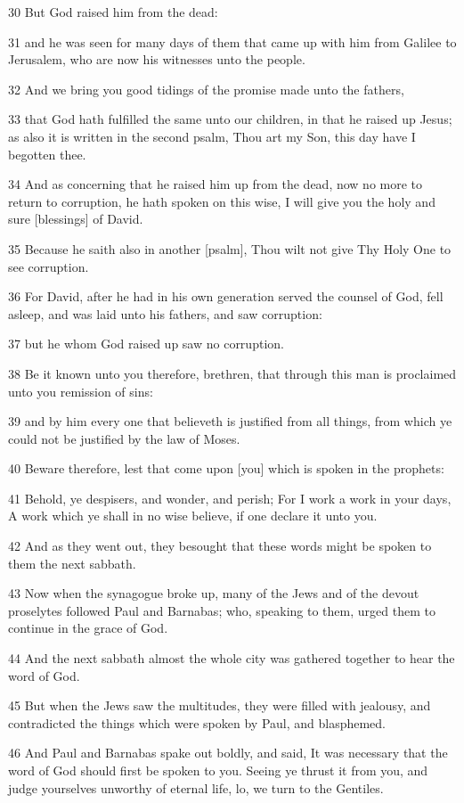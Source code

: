 \par 30 But God raised him from the dead:
\par 31 and he was seen for many days of them that came up with him from Galilee to Jerusalem, who are now his witnesses unto the people.
\par 32 And we bring you good tidings of the promise made unto the fathers,
\par 33 that God hath fulfilled the same unto our children, in that he raised up Jesus; as also it is written in the second psalm, Thou art my Son, this day have I begotten thee.
\par 34 And as concerning that he raised him up from the dead, now no more to return to corruption, he hath spoken on this wise, I will give you the holy and sure [blessings] of David.
\par 35 Because he saith also in another [psalm], Thou wilt not give Thy Holy One to see corruption.
\par 36 For David, after he had in his own generation served the counsel of God, fell asleep, and was laid unto his fathers, and saw corruption:
\par 37 but he whom God raised up saw no corruption.
\par 38 Be it known unto you therefore, brethren, that through this man is proclaimed unto you remission of sins:
\par 39 and by him every one that believeth is justified from all things, from which ye could not be justified by the law of Moses.
\par 40 Beware therefore, lest that come upon [you] which is spoken in the prophets:
\par 41 Behold, ye despisers, and wonder, and perish; For I work a work in your days, A work which ye shall in no wise believe, if one declare it unto you.
\par 42 And as they went out, they besought that these words might be spoken to them the next sabbath.
\par 43 Now when the synagogue broke up, many of the Jews and of the devout proselytes followed Paul and Barnabas; who, speaking to them, urged them to continue in the grace of God.
\par 44 And the next sabbath almost the whole city was gathered together to hear the word of God.
\par 45 But when the Jews saw the multitudes, they were filled with jealousy, and contradicted the things which were spoken by Paul, and blasphemed.
\par 46 And Paul and Barnabas spake out boldly, and said, It was necessary that the word of God should first be spoken to you. Seeing ye thrust it from you, and judge yourselves unworthy of eternal life, lo, we turn to the Gentiles.

